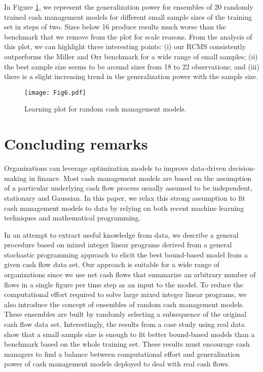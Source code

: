 In Figure \ref{fig:learning}, we represent the generalization power for ensembles of 20 randomly trained cash management models for different small sample sizes of the training set in steps of two. Sizes below 16 produce results much worse than the benchmark that we remove from the plot for scale reasons. From the analysis of this plot, we can highlight three interesting points: (i) our RCMS consistently outperforms the Miller and Orr benchmark for a wide range of small samples; (ii) the best sample size seems to be around sizes from 18 to 22 observations; and (iii) there is a slight increasing trend in the generalization power with the sample size.

\begin{figure}[!htb]
\centering
\texttt{[image: Fig6.pdf]}
\caption{\label{fig:learning} Learning plot for random cash management models.}
\end{figure}



\section{Concluding remarks\label{sec:conclusions}}


Organizations can leverage optimization models to improve data-driven decision-making in finance. Most cash management models are based on the assumption of a particular underlying cash flow process usually assumed to be independent, stationary and Gaussian. In this paper, we relax this strong assumption to fit cash management models to data by relying on both recent machine learning techniques and mathematical programming.

In an attempt to extract useful knowledge from data, we describe a general procedure based on mixed integer linear programs derived from a general stochastic programming approach to elicit the best bound-based model from a given cash flow data set. Our approach is suitable for a wide range of organizations since we use net cash flows that summarize an arbitrary number of flows in a single figure per time step as an input to the model. To reduce the computational effort required to solve large mixed integer linear programs, we also introduce the concept of ensembles of random cash management models. These ensembles are built by randomly selecting a subsequence of the original cash flow data set. Interestingly, the results from a case study using real data show that a small sample size is enough to fit better bound-based models than a benchmark based on the whole training set. These results must encourage cash managers to find a balance between computational effort and generalization power of cash management models deployed to deal with real cash flows. 

